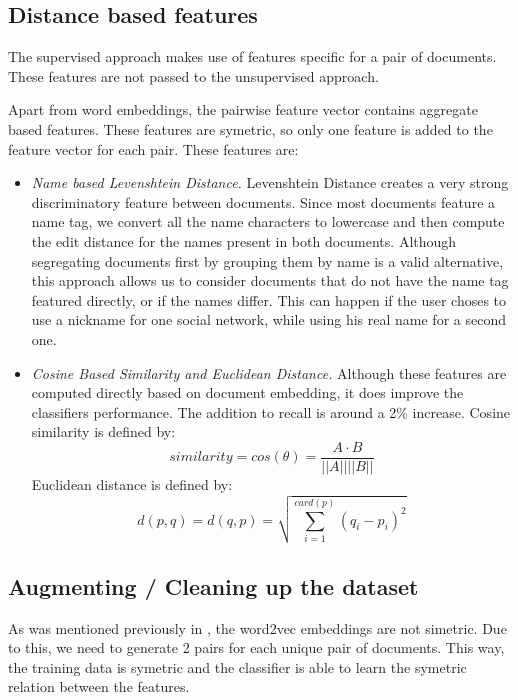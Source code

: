 \subsection{Distance based features}
\label{sub-sec:distance-based-features}

The supervised approach makes use of features specific for a pair of documents.
These features are not passed to the unsupervised approach.

Apart from word embeddings, the pairwise feature vector contains aggregate based
features. These features are symetric, so only one feature is added to the feature
vector for each pair. These features are:
\begin{itemize}
    \item
      {\em Name based Levenshtein Distance. }Levenshtein Distance creates
      a very strong discriminatory feature between documents. Since most documents
      feature a name tag, we convert all the name characters to lowercase and then
      compute the edit distance for the names present in both documents. Although
      segregating documents first by grouping them by name is a valid alternative,
      this approach allows us to consider documents that do not have the name
      tag featured directly, or if the names differ. This can happen if the user
      choses to use a nickname for one social network, while using his real name
      for a second one.
    \item
      {\em Cosine Based Similarity and Euclidean Distance. } Although these features
      are computed directly based on document embedding, it does
      improve the classifiers performance. The addition to recall
      is around a 2\% increase. Cosine similarity is defined by:
      \[ similarity = cos(\theta) = \frac{A \cdot B}{||A|| ||B||} \]
      Euclidean distance is defined by:
      \[ d(p, q) = d(q, p) = \sqrt{\sum_{i=1}^{card(p)}(q_i - p_i)^2} \]
\end{itemize}

\subsection{Augmenting / Cleaning up the dataset}
As was mentioned previously in ,
the word2vec embeddings are not simetric. Due to this, we need to generate
2 pairs for each unique pair of documents. This way, the training data is
symetric and the classifier is able to learn the symetric relation between
the features.

